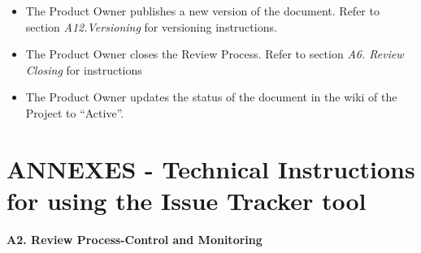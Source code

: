 \documentclass{template/openetcs_article}
\begin{document}
\begin{itemize}
\item The Product Owner publishes a new version of the document. Refer to section {\it A12.Versioning} for versioning instructions.
\item The Product Owner closes the Review Process. Refer to section {\it A6. Review Closing} for instructions 
\item The Product Owner updates the status of the document in the wiki of the Project to “Active”.
\end{itemize}

\section{ANNEXES - Technical Instructions for using the Issue Tracker tool}

\textbf{A2. Review Process-Control and Monitoring}
\end{document}

